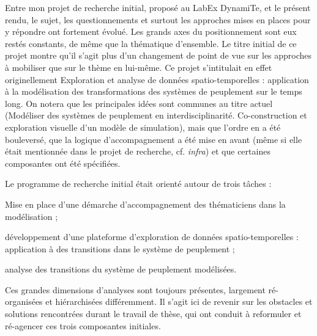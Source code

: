 Entre mon projet de recherche initial, proposé au LabEx DynamiTe, et le présent rendu, le sujet, les questionnements et surtout les approches mises en places pour y répondre ont fortement évolué.
Les grands axes du positionnement sont eux restés constants, de même que la thématique d'ensemble.
Le titre initial de ce projet montre qu'il s'agit plus d'un changement de point de vue sur les approches à mobiliser que sur le thème en lui-même.
Ce projet s'intitulait en effet originellement \og Exploration et analyse de données spatio-temporelles : application à la modélisation des transformations des systèmes de peuplement sur le temps long\fg{}.
On notera que les principales idées sont communes au titre actuel (\og Modéliser des systèmes de peuplement en interdisciplinarité. Co-construction et exploration visuelle d’un modèle de simulation\fg{}), mais que l'ordre en a été bouleversé, que la logique d'accompagnement a été mise en avant (même si elle était mentionnée dans le projet de recherche, cf. \textit{infra}) et que certaines composantes ont été spécifiées.

Le programme de recherche initial était orienté autour de trois tâches :

\begin{compactenum}\vspace*{-.5em}
	\item \og Mise en place d'une démarche d'accompagnement des thématiciens dans la modélisation\fg{} ;
	\item \og développement d'une plateforme d'exploration de données spatio-temporelles : application à des transitions dans le système de peuplement\fg{} ;
	\item \og analyse des transitions du système de peuplement modélisées\fg{}.
\end{compactenum}\vspace*{-.5em}

Ces grandes dimensions d'analyses sont toujours présentes, largement ré-organisées et hiérarchisées différemment.
Il s'agit ici de revenir sur les obstacles et solutions rencontrées durant le travail de thèse, qui ont conduit à reformuler et ré-agencer ces trois composantes initiales.



